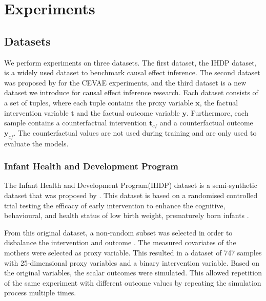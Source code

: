 \documentclass{report}
\newcommand{\bt}{\mathbf{t}}
\newcommand{\bx}{\mathbf{x}}
\newcommand{\by}{\mathbf{y}}
\begin{document}
\chapter{Experiments}



\section{Datasets}
We perform experiments on three datasets. The first dataset, the IHDP dataset, is a widely used dataset to benchmark causal effect inference. The second dataset was proposed by \textcite{louizos2017causal} for the CEVAE experiments, and the third dataset is a new dataset we introduce for causal effect inference research. Each dataset consists of a set of tuples, where each tuple contains the proxy variable $\bx$, the factual intervention variable $\bt$ and the factual outcome variable $\by$. Furthermore, each sample contains a counterfactual intervention $\bt_{cf}$ and a counterfactual outcome $\by_{cf}$. The counterfactual values are not used during training and are only used to evaluate the models.

\subsection{Infant Health and Development Program}\label{section:data_ihdp}
The Infant Health and Development Program(IHDP) dataset is a semi-synthetic dataset that was proposed by \textcite{hill2011bayesian}. This dataset is based on a randomised controlled trial testing the efficacy of early intervention to enhance the cognitive, behavioural, and health status of low birth weight, prematurely born infants \parencite{ramey1992infant}. 

From this original dataset, a non-random subset was selected in order to disbalance the intervention and outcome \parencite[]{hill2011bayesian}. The measured covariates of the mothers were selected as proxy variable.
This resulted in a dataset of 747 samples with 25-dimensional proxy variables and a binary intervention variable. Based on the original variables, the scalar outcomes were simulated. This allowed repetition of the same experiment with different outcome values by repeating the simulation process multiple times.
\end{document}
